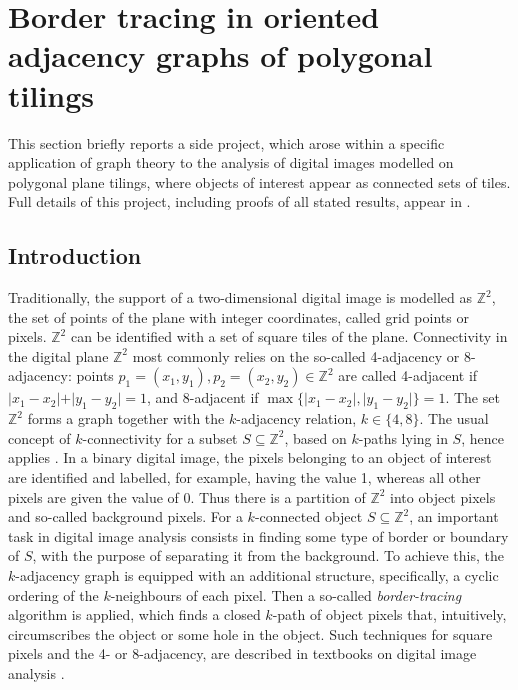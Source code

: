 
\section{Border tracing in oriented adjacency graphs of polygonal tilings}\label{sec:border_tracing}

This section briefly reports a side project, which arose within a specific application of graph theory to the analysis of digital images modelled on polygonal plane tilings, where objects of interest appear as connected sets of tiles.
Full details of this project, including proofs of all stated results, appear in \cite{WiederholdMatosWiederhold2026}.

\subsection{Introduction}

Traditionally, the support of a two-dimensional digital image is modelled as $\mathbb{Z}^2$, the set of points of the plane with integer coordinates, called grid points or pixels.
$\mathbb{Z}^2$ can be identified with a set of square tiles of the plane.
Connectivity in the digital plane $\mathbb{Z}^2$ most commonly relies on the so-called 4-adjacency or 8-adjacency:
points $p_1=(x_1,y_1), p_2=(x_2,y_2)\in \mathbb{Z}^2$ are called 4-adjacent if $\vert x_1 - x_2\vert + \vert y_1 - y_2\vert =1$, and 8-adjacent if $\max\{ \vert x_1 - x_2\vert , \vert y_1 - y_2\vert \} =1$.
The set $\mathbb{Z}^2$ forms a graph together with the $k$-adjacency relation, $k\in \{ 4,8\}$.
The usual concept of $k$-connectivity for a subset $S\subseteq\mathbb{Z}^2$, based on $k$-paths lying in $S$, hence applies \cite{gonzalez2018,klette2004}.
In a binary digital image, the pixels belonging to an object of interest are identified and labelled, for example, having the value 1, whereas all other pixels are given the value of 0.
Thus there is a partition of $\mathbb{Z}^2$ into object pixels and so-called background pixels.
For a $k$-connected object $S\subseteq\mathbb{Z}^2$, an important task in digital image analysis consists in finding some type of border or boundary of $S$, with the purpose of separating it from the background.
To achieve this, the $k$-adjacency graph is equipped with an additional structure, specifically, a cyclic ordering of the $k$-neighbours of each pixel.
Then a so-called \emph{border-tracing} algorithm is applied, which finds a closed $k$-path of object pixels that, intuitively, circumscribes the object or some hole in the object.
Such techniques for square pixels and the 4- or 8-adjacency, are described in textbooks on digital image analysis \cite{gonzalez2018,klette2004}.

